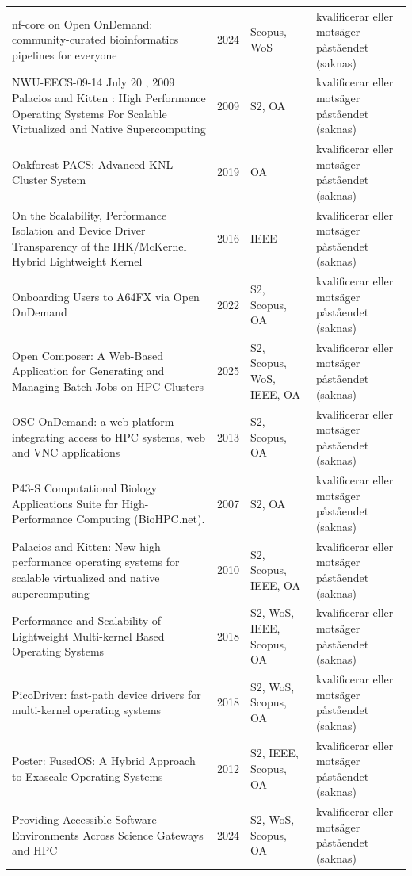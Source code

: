 \begin{longtable}{@{}%
  >{\raggedright\arraybackslash}p{}c%
  >{\raggedright\arraybackslash}p{}%
  >{\raggedright\arraybackslash}p{}@{}}
nf-core on Open OnDemand: community-curated bioinformatics pipelines for everyone & 2024 & Scopus, WoS & kvalificerar eller motsäger påståendet (saknas) \\
NWU-EECS-09-14 July 20 , 2009 Palacios and Kitten : High Performance Operating Systems For Scalable Virtualized and Native Supercomputing & 2009 & S2, OA & kvalificerar eller motsäger påståendet (saknas) \\
Oakforest-PACS: Advanced KNL Cluster System & 2019 & OA & kvalificerar eller motsäger påståendet (saknas) \\
On the Scalability, Performance Isolation and Device Driver Transparency of the IHK/McKernel Hybrid Lightweight Kernel & 2016 & IEEE & kvalificerar eller motsäger påståendet (saknas) \\
Onboarding Users to A64FX via Open OnDemand & 2022 & S2, Scopus, OA & kvalificerar eller motsäger påståendet (saknas) \\
Open Composer: A Web-Based Application for Generating and Managing Batch Jobs on HPC Clusters & 2025 & S2, Scopus, WoS, IEEE, OA & kvalificerar eller motsäger påståendet (saknas) \\
OSC OnDemand: a web platform integrating access to HPC systems, web and VNC applications & 2013 & S2, Scopus, OA & kvalificerar eller motsäger påståendet (saknas) \\
P43-S Computational Biology Applications Suite for High-Performance Computing (BioHPC.net). & 2007 & S2, OA & kvalificerar eller motsäger påståendet (saknas) \\
Palacios and Kitten: New high performance operating systems for scalable virtualized and native supercomputing & 2010 & S2, Scopus, IEEE, OA & kvalificerar eller motsäger påståendet (saknas) \\
Performance and Scalability of Lightweight Multi-kernel Based Operating Systems & 2018 & S2, WoS, IEEE, Scopus, OA & kvalificerar eller motsäger påståendet (saknas) \\
PicoDriver: fast-path device drivers for multi-kernel operating systems & 2018 & S2, WoS, Scopus, OA & kvalificerar eller motsäger påståendet (saknas) \\
Poster: FusedOS: A Hybrid Approach to Exascale Operating Systems & 2012 & S2, IEEE, Scopus, OA & kvalificerar eller motsäger påståendet (saknas) \\
Providing Accessible Software Environments Across Science Gateways and HPC & 2024 & S2, WoS, Scopus, OA & kvalificerar eller motsäger påståendet (saknas) \\

\end{longtable}
